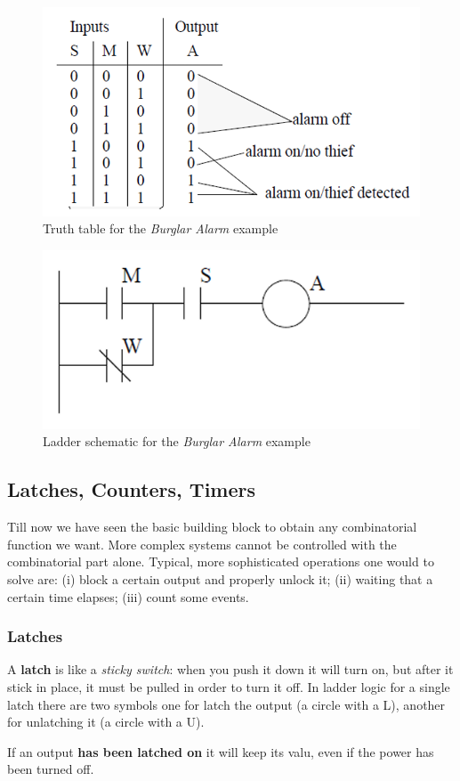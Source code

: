 \begin{figure}
    \centering
    \includegraphics[scale=0.6]{img/example_truth_table.png}
    \caption{Truth table for the \textit{Burglar Alarm} example}
\end{figure}

\begin{figure}
    \centering
    \includegraphics[scale=0.7]{img/example_burglar_ladder.png}
    \caption{Ladder schematic for the \textit{Burglar Alarm} example}
\end{figure}

\subsection{Latches, Counters, Timers}
Till now we have seen the basic building block to obtain any combinatorial function we want. More complex systems cannot be controlled with the combinatorial part alone. Typical, more sophisticated operations one would to solve are: (i) block a certain output and properly unlock it; (ii) waiting that a certain time elapses; (iii) count some events.

\subsubsection{Latches}
A \textbf{latch} is like a \textit{sticky switch}: when you push it down it will turn on, but after it stick in place, it must be pulled in order to turn it off. In ladder logic for a single latch there are two symbols one for latch the output (a circle with a L), another for unlatching it (a circle with a U). 
\begin{remark}
    If an output \textbf{has been latched on} it will keep its valu, even if the power has been turned off.
\end{remark} 

